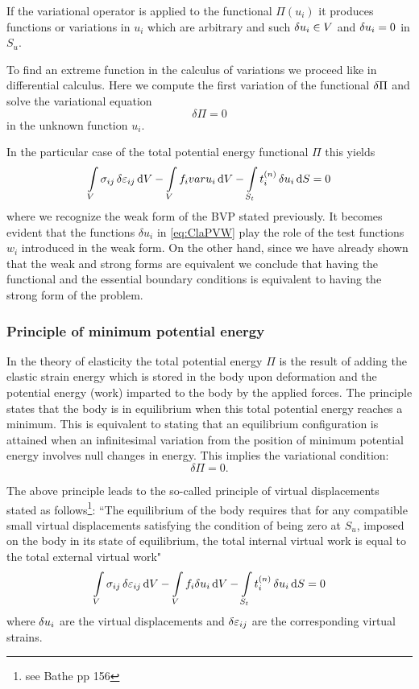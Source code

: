 If the variational operator is applied to the functional $\Pi(u_i)$ it produces functions or variations in $u_i$ which are arbitrary and such $\var{u_i} \in V$ and $\var{u_i} = 0$ in $S_u$.

To find an extreme function in the calculus of variations we proceed like in differential calculus. Here we compute the first variation of the functional $\var{\Pi}$ and solve the variational equation
\begin{equation}\label{eq:vareq}
    \delta \Pi  = 0
\end{equation}
in the unknown function $u_i$. 

In the particular case of the total potential energy functional $\Pi$ this yields
\begin{equation}\label{eq:ClaPVW}
    \int\limits_V \sigma _{ij}\var{\varepsilon_{ij}}\dd{V}  - \int\limits_V f_i var{u_i} \dd{V}  - \int\limits_{S_t} t_i^{(n)} \var{u_i}\dd{S}  = 0
\end{equation}
where we recognize the weak form of the BVP stated previously. It becomes evident that the functions $\delta {u_i}$ in \cref{eq:ClaPVW} play the role of the test functions $w_i$ introduced in the weak form. On the other hand, since we have already shown that the weak and strong forms are equivalent we conclude that having the functional and the essential boundary conditions is equivalent to having the strong form of the problem.


\subsubsection*{Principle of minimum potential energy}
In the theory of elasticity the total potential energy $\Pi$ is the result of adding the elastic strain energy which is stored in the body upon deformation and the potential energy (work) imparted to the body by the applied forces. The principle states that the body is in equilibrium when this total potential energy reaches a minimum. This is equivalent to stating that an equilibrium configuration is attained when an infinitesimal variation from the position of minimum potential energy involves null changes in energy. This implies the variational condition:
\begin{equation}\label{vareq2}
    \delta \Pi  = 0.
\end{equation}

The above principle leads to the so-called principle of virtual displacements stated as follows\footnote{see Bathe pp 156}:
``The equilibrium of the body requires that for any compatible small virtual displacements satisfying the condition of being zero at $S_u$, imposed on the body in its state of equilibrium, the total internal virtual work is equal to the total external virtual work"
\[\int\limits_V \sigma _{ij}\var{\varepsilon_{ij}}\dd{V}  - \int\limits_V f_i\delta u_i\dd{V}  - \int\limits_{S_t} t_i^{(n)}\var{u_i}\dd{S}  = 0\]
where $\var{u_i}$ are the virtual displacements and $\var{ \varepsilon_{ij}}$ are the corresponding virtual strains.


